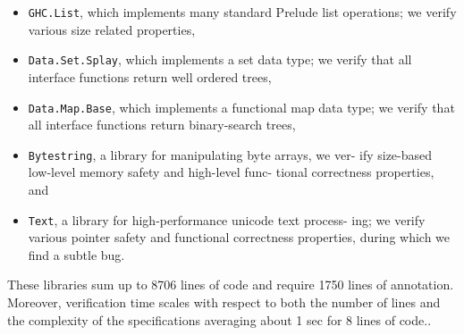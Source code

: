 \begin{itemize}
\item \texttt{GHC.List}, which implements many standard Prelude list
operations; we verify various size related properties,
\item \texttt{Data.Set.Splay}, which implements a set data type; 
we verify that all interface functions return well ordered trees,
\item \texttt{Data.Map.Base}, which implements a functional map data
type; we verify that all interface functions return
binary-search trees,
\item \texttt{Bytestring}, a library for manipulating byte arrays, we ver-
ify size-based low-level memory safety and high-level func-
tional correctness properties, and
\item \texttt{Text}, a library for high-performance unicode text process-
ing; we verify various pointer safety and functional correctness
properties, during which we find a subtle bug.
\end{itemize}

These libraries sum up to 8706 lines of code and require 
1750 lines of annotation.
Moreover, verification time scales
with respect to both the number of lines 
and the complexity of the specifications
averaging about 1 sec for 8 lines of code..

